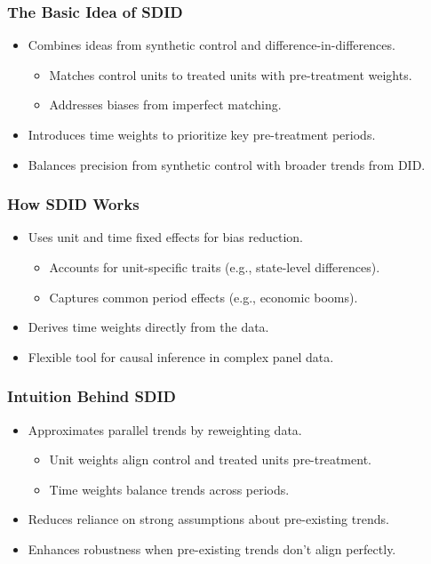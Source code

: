 \documentclass{beamer}
\begin{document}
\begin{frame}
\frametitle{The Basic Idea of SDID}

\begin{itemize}
    \item Combines ideas from synthetic control and difference-in-differences.
        \begin{itemize}
            \item Matches control units to treated units with pre-treatment weights.
            \item Addresses biases from imperfect matching.
        \end{itemize}
    \item Introduces time weights to prioritize key pre-treatment periods.
    \item Balances precision from synthetic control with broader trends from DID.
\end{itemize}

\end{frame}

\begin{frame}
\frametitle{How SDID Works}

\begin{itemize}
    \item Uses unit and time fixed effects for bias reduction.
        \begin{itemize}
            \item Accounts for unit-specific traits (e.g., state-level differences).
            \item Captures common period effects (e.g., economic booms).
        \end{itemize}
    \item Derives time weights directly from the data.
    \item Flexible tool for causal inference in complex panel data.
\end{itemize}

\end{frame}

\begin{frame}
\frametitle{Intuition Behind SDID}

\begin{itemize}
    \item Approximates parallel trends by reweighting data.
        \begin{itemize}
            \item Unit weights align control and treated units pre-treatment.
            \item Time weights balance trends across periods.
        \end{itemize}
    \item Reduces reliance on strong assumptions about pre-existing trends.
    \item Enhances robustness when pre-existing trends don’t align perfectly.
\end{itemize}

\end{frame}
\end{document}
